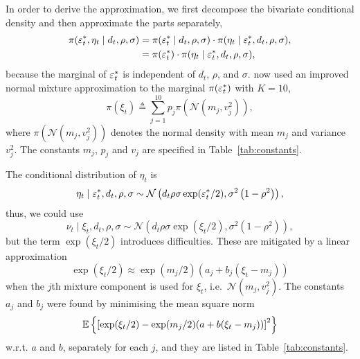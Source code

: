 In order to derive the approximation, we first decompose the bivariate conditional density and then approximate the parts separately,
\begin{align}
\pi(\varepsilon_t^\ast,\eta_t\mid d_t,\rho,\sigma) &= \pi(\varepsilon_t^\ast\mid d_t,\rho,\sigma)\cdot \pi(\eta_t\mid\varepsilon_t^\ast,d_t,\rho,\sigma),\nonumber \\
&= \pi(\varepsilon_t^\ast)\cdot \pi(\eta_t\mid\varepsilon_t^\ast,d_t,\rho,\sigma)\label{eq:decomp},
\end{align}
because the marginal of $\varepsilon_t^\ast$ is independent of $d_t$, $\rho$, and $\sigma$.
\citet{Omori2007} now used an improved normal mixture approximation to the marginal $\pi(\varepsilon_t^\ast)$ with $K=10$,
\begin{equation}\label{eq:ets}
\pi(\xi_t)\triangleq\sum_{j=1}^{10}p_j\pi\left(\mathcal{N}\left(m_j,v_j^2\right)\right),
\end{equation}
where $\pi\left(\mathcal{N}\left(m_j,v_j^2\right)\right)$ denotes the normal density with mean $m_j$ and variance $v_j^2$.
The constants $m_j$, $p_j$ and $v_j$ are specified in Table~\ref{tab:constants}.

The conditional distribution of $\eta_t$ is
\begin{equation*}
\eta_t\mid\varepsilon_t^\ast,d_t,\rho,\sigma\sim\mathcal{N}\left(d_t\rho\sigma\exp(\varepsilon_t^\ast/2),\sigma^2\left(1-\rho^2\right)\right),
\end{equation*}
thus, we could use
\begin{equation}\label{eq:eta}
\nu_t\mid\xi_t,d_t,\rho,\sigma\sim\mathcal{N}\left(d_t\rho\sigma\exp(\xi_t/2),\sigma^2\left(1-\rho^2\right)\right),
\end{equation}
but the term $\exp(\xi_t/2)$ introduces difficulties.
These are mitigated by a linear approximation
\begin{equation}\label{eq:etslinear}
\exp(\xi_t/2)\approx\exp(m_j/2)(a_j+b_j(\xi_t-m_j))
\end{equation}
when the $j$th mixture component is used for $\xi_t$, i.e.\ $\mathcal{N}(m_j,v_j^2)$.
The constants $a_j$ and $b_j$ were found by minimising the mean square norm 
\begin{equation*}
\mathbb{E}\left\{\left[\exp(\xi_t/2)-\exp(m_j/2)(a+b(\xi_t-m_j))\right]^2\right\}
\end{equation*}
w.r.t. $a$ and $b$, separately for each $j$, and they are listed in Table~\ref{tab:constants}.

